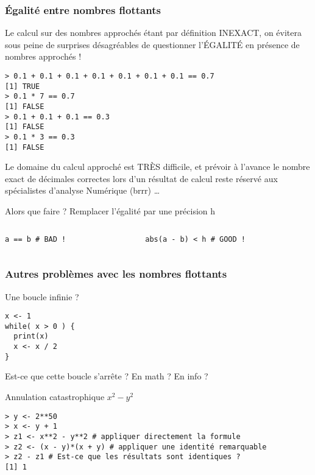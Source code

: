 \documentclass[10pt]{beamer}
\begin{document}

\begin{frame}[fragile]
  \frametitle{Égalité entre nombres flottants}
  Le calcul sur des nombres approchés étant par définition \alert{INEXACT}, on évitera sous peine de surprises désagréables de questionner l'\alert{ÉGALITÉ} en présence de nombres approchés !
  \begin{lstlisting}
> 0.1 + 0.1 + 0.1 + 0.1 + 0.1 + 0.1 + 0.1 == 0.7
[1] TRUE
> 0.1 * 7 == 0.7
[1] FALSE
> 0.1 + 0.1 + 0.1 == 0.3
[1] FALSE
> 0.1 * 3 == 0.3
[1] FALSE
\end{lstlisting}

Le domaine du calcul approché est TRÈS difficile, et prévoir à l'avance le nombre exact de décimales correctes lors d'un résultat de calcul reste réservé aux spécialistes d'analyse Numérique (brrr) \dots

\begin{block}{Alors que faire ? Remplacer l'égalité par une précision h}
\begin{columns}[t]
\begin{column}{0.48\textwidth}
  \begin{lstlisting}[style=editor]
a == b # BAD !
  \end{lstlisting}
\end{column}
\begin{column}{0.48\textwidth}
  \begin{lstlisting}[style=editor]
abs(a - b) < h # GOOD !
  \end{lstlisting}
\end{column}
\end{columns}
\end{block}
\end{frame}

\begin{frame}[fragile]
  \frametitle{Autres problèmes avec les nombres flottants}


  \begin{exampleblock}{Une boucle infinie ?}
  \begin{lstlisting}[style=edblock]
x <- 1
while( x > 0 ) {
  print(x)
  x <- x / 2
}
\end{lstlisting}
Est-ce que cette boucle s'arrête ? En math ? En info ?
\end{exampleblock}


\begin{exampleblock}{Annulation catastrophique $x^2 - y^2$}
  \begin{lstlisting}[style=block]
> y <- 2**50
> x <- y + 1
> z1 <- x**2 - y**2 # appliquer directement la formule
> z2 <- (x - y)*(x + y) # appliquer une identité remarquable
> z2 - z1 # Est-ce que les résultats sont identiques ?
[1] 1
  \end{lstlisting}
\end{exampleblock}

\end{frame}
\end{document}
